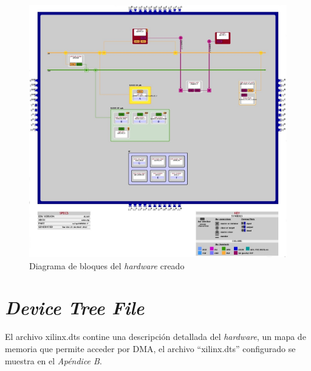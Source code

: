   \begin{figure}[h!] 
  \centering
  \includegraphics[scale=.40]{./figuras/system.jpg}
  \caption{Diagrama de bloques del \emph{hardware} creado}
  \label{system}
  \end{figure}

\clearpage \newpage

\section{\emph{Device Tree File}}

El archivo xilinx.dts contine una descripción detallada del \emph{hardware}, un
mapa de memoria que permite acceder por DMA, el archivo ``xilinx.dts''
configurado se muestra en el \emph{Apéndice B}.

